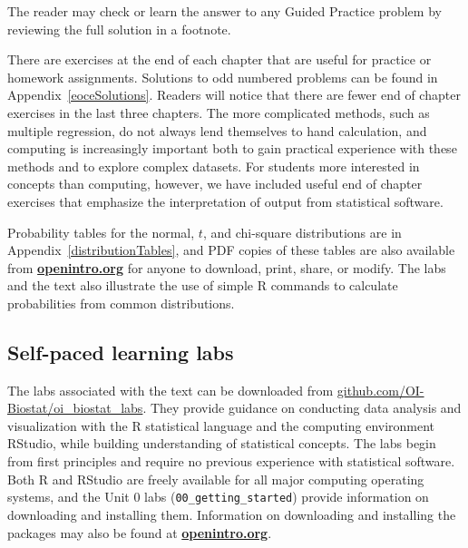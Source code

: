 \begin{exercisewrap}
\begin{nexercise}
The reader may check or learn the answer to any Guided Practice
problem by reviewing the full solution in a footnote.\footnotemark{}
\end{nexercise}
\end{exercisewrap}

There are exercises at the end of each chapter that are useful for practice or homework assignments. Solutions to odd numbered problems can be found in Appendix~\ref{eoceSolutions}. Readers will notice that there are fewer end of chapter exercises in the last three chapters.  The more complicated methods, such as multiple regression, do not always lend themselves to hand calculation, and computing is increasingly important both to gain practical experience with these methods and to explore complex datasets. For students more interested in concepts than computing, however, we have included useful end of chapter exercises that emphasize the interpretation of output from statistical software.

Probability tables for the normal, $t$, and chi-square distributions are in Appendix~\ref{distributionTables}, and PDF copies of these tables are also available from \href{http://www.openintro.org}{\color{black}\textbf{openintro.org}} for anyone to download, print, share, or modify.  The labs and the text also illustrate the use of simple \textsf{R} commands to calculate probabilities from common distributions.

\subsection*{Self-paced learning labs}

The labs associated with the text can be downloaded from \url{github.com/OI-Biostat/oi_biostat_labs}.  They provide guidance on conducting data analysis and visualization with the \textsf{R} statistical language and the computing environment RStudio, while building understanding of statistical concepts.  The labs begin from first principles and require no previous experience with statistical software. Both \textsf{R} and RStudio are freely available for all major computing operating systems, and the Unit 0 labs (\texttt{00\_getting\_started}) provide information on downloading and installing them. Information on downloading and installing the packages may also be found at \href{http://www.openintro.org}{\color{black}\textbf{openintro.org}}. 

